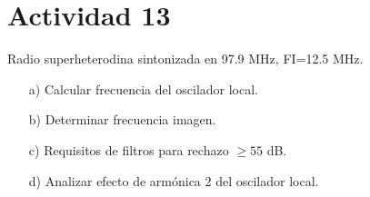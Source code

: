 \section{Actividad 13}

Radio superheterodina sintonizada en 97.9 MHz, FI=12.5 MHz.  

\begin{itemize}
    \item[a)] Calcular frecuencia del oscilador local.  
    \item[b)] Determinar frecuencia imagen.  
    \item[c)] Requisitos de filtros para rechazo $\geq 55$ dB.  
    \item[d)] Analizar efecto de armónica 2 del oscilador local.  
\end{itemize}